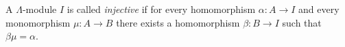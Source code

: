A $\Lambda$-module $I$ is called \textit{injective} if for every homomorphism $\alpha : A \rightarrow I$ and every monomorphism $\mu : A \rightarrow B$ there exists a homomorphism $\beta : B \rightarrow I$ such that $\beta \mu = \alpha$.
